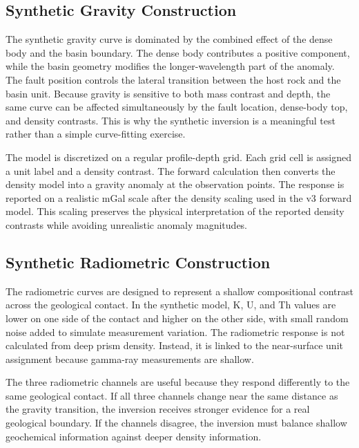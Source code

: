 \documentclass[12pt,a4paper]{article}
\begin{document}
\subsection{Synthetic Gravity Construction}
The synthetic gravity curve is dominated by the combined effect of the dense body and the basin boundary. The dense body contributes a positive component, while the basin geometry modifies the longer-wavelength part of the anomaly. The fault position controls the lateral transition between the host rock and the basin unit. Because gravity is sensitive to both mass contrast and depth, the same curve can be affected simultaneously by the fault location, dense-body top, and density contrasts. This is why the synthetic inversion is a meaningful test rather than a simple curve-fitting exercise.

The model is discretized on a regular profile-depth grid. Each grid cell is assigned a unit label and a density contrast. The forward calculation then converts the density model into a gravity anomaly at the observation points. The response is reported on a realistic mGal scale after the density scaling used in the v3 forward model. This scaling preserves the physical interpretation of the reported density contrasts while avoiding unrealistic anomaly magnitudes.

\subsection{Synthetic Radiometric Construction}
The radiometric curves are designed to represent a shallow compositional contrast across the geological contact. In the synthetic model, K, U, and Th values are lower on one side of the contact and higher on the other side, with small random noise added to simulate measurement variation. The radiometric response is not calculated from deep prism density. Instead, it is linked to the near-surface unit assignment because gamma-ray measurements are shallow.

The three radiometric channels are useful because they respond differently to the same geological contact. If all three channels change near the same distance as the gravity transition, the inversion receives stronger evidence for a real geological boundary. If the channels disagree, the inversion must balance shallow geochemical information against deeper density information.
\end{document}
